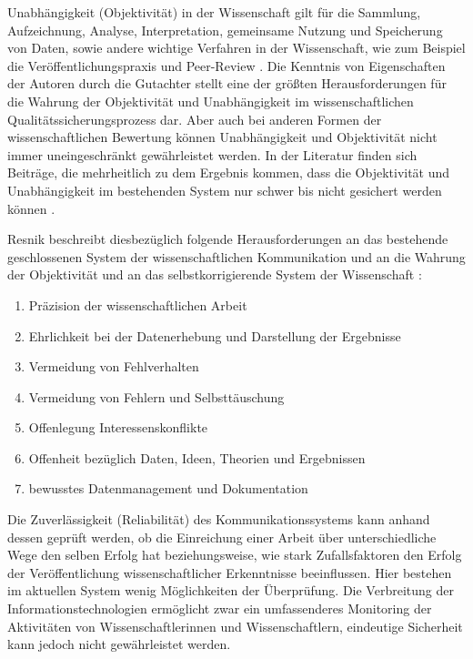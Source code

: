 Unabhängigkeit (Objektivität) in der Wissenschaft gilt für die Sammlung, Aufzeichnung, Analyse, Interpretation, gemeinsame Nutzung und Speicherung von Daten, sowie andere wichtige Verfahren in der Wissenschaft, wie zum Beispiel die Veröffentlichungspraxis und Peer-Review \cite{resnik_2005_ethics}. Die Kenntnis von Eigenschaften der Autoren durch die Gutachter stellt eine der größten Herausforderungen für die Wahrung der Objektivität und Unabhängigkeit im wissenschaftlichen Qualitätssicherungsprozess dar. Aber auch bei anderen Formen der wissenschaftlichen Bewertung können Unabhängigkeit und Objektivität nicht immer uneingeschränkt gewährleistet werden. In der Literatur finden sich Beiträge, die mehrheitlich zu dem Ergebnis kommen, dass die Objektivität und Unabhängigkeit im bestehenden System nur schwer bis nicht gesichert werden können \cite{binswanger_2014_excellence}.

Resnik beschreibt diesbezüglich folgende Herausforderungen an das bestehende geschlossenen System der wissenschaftlichen Kommunikation und an die Wahrung der Objektivität und an das selbstkorrigierende System der Wissenschaft \cite{resnik_2005_ethics}:
\begin{enumerate}
\item Präzision der wissenschaftlichen Arbeit
\item Ehrlichkeit bei der Datenerhebung und Darstellung der Ergebnisse
\item Vermeidung von Fehlverhalten
\item Vermeidung von Fehlern und Selbsttäuschung
\item Offenlegung Interessenskonflikte
\item Offenheit bezüglich Daten, Ideen, Theorien und  Ergebnissen
\item bewusstes Datenmanagement und Dokumentation
\end{enumerate}

Die Zuverlässigkeit (Reliabilität) des Kommunikationssystems kann anhand dessen geprüft werden, ob die Einreichung einer Arbeit über unterschiedliche Wege den selben Erfolg hat beziehungsweise, wie stark Zufallsfaktoren den Erfolg der Veröffentlichung wissenschaftlicher Erkenntnisse beeinflussen. Hier bestehen im aktuellen System wenig Möglichkeiten der Überprüfung. Die Verbreitung der Informationstechnologien ermöglicht zwar ein umfassenderes Monitoring der Aktivitäten von Wissenschaftlerinnen und Wissenschaftlern, eindeutige Sicherheit kann jedoch nicht gewährleistet werden.


